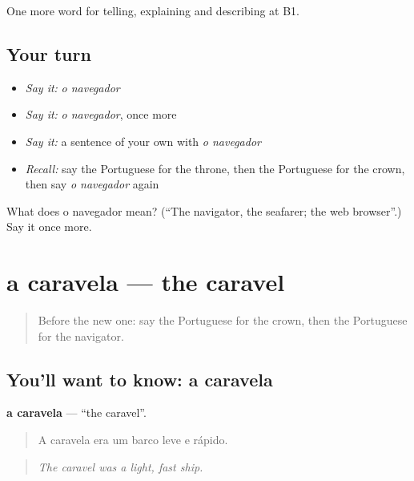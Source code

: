 \begin{grammarlens}[title={What you've built}]
One more word for telling, explaining and describing at B1.
\end{grammarlens}

\subsection*{Your turn}
\begin{itemize}
\raggedright
  \item \emph{Say it:} \emph{o navegador}
  \item \emph{Say it:} \emph{o navegador}, once more
  \item \emph{Say it:} a sentence of your own with \emph{o navegador}
  \item \emph{Recall:} say the Portuguese for the throne, then the Portuguese for the crown, then say \emph{o navegador} again
\end{itemize}

\begin{tcolorbox}[breakable,colback=teal!4,colframe=teal!35!black,title={Before you move on}]
What does o navegador mean? (\textquotedblleft{}The navigator, the seafarer; the web browser\textquotedblright{}.) Say it once more.
\end{tcolorbox}
\section[a caravela]{a caravela — the caravel}

\label{lesson:PT-C328-caravela}



\begin{quote}
Before the new one: say the Portuguese for the crown, then the Portuguese for the navigator.
\end{quote}

\subsection*{You'll want to know: a caravela}
\textbf{a caravela} — \textquotedblleft{}the caravel\textquotedblright{}.

\begin{quote}
A caravela era um barco leve e rápido.
\end{quote}

\begin{quote}
\emph{The caravel was a light, fast ship.}
\end{quote}

